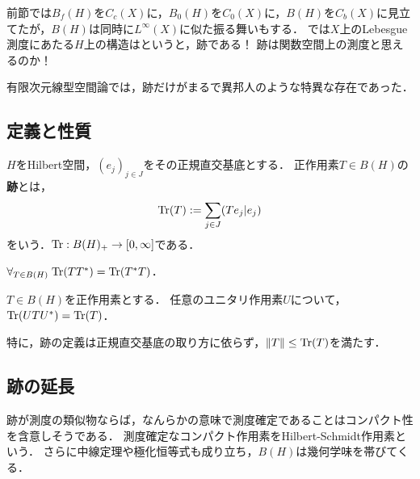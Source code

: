 \documentclass[uplatex,dvipdfmx]{jsreport}
\begin{document}
\begin{tcolorbox}[colframe=ForestGreen, colback=ForestGreen!10!white,breakable,colbacktitle=ForestGreen!40!white,coltitle=black,fonttitle=\bfseries\sffamily,
title=跡は関数空間上の測度とみなせる]
    前節では$B_f(H)$を$C_c(X)$に，$B_0(H)$を$C_0(X)$に，$B(H)$を$C_b(X)$に見立てたが，$B(H)$は同時に$L^\infty(X)$に似た振る舞いもする．
    では$X$上のLebesgue測度にあたる$H$上の構造はというと，跡である！
    跡は関数空間上の測度と思えるのか！

    有限次元線型空間論では，跡だけがまるで異邦人のような特異な存在であった．
\end{tcolorbox}

\subsection{定義と性質}

\begin{definition}[trace]
    $H$をHilbert空間，$(e_j)_{j\in J}$をその正規直交基底とする．
    正作用素$T\in B(H)$の\textbf{跡}とは，
    \[\mathrm{Tr}(T):=\sum_{j\in J}(Te_j|e_j)\]
    をいう．$\mathrm{Tr}:B(H)_+\to[0,\infty]$である．
\end{definition}

\begin{proposition}
    $\forall_{T\in B(H)}\;\mathrm{Tr}(TT^*)=\mathrm{Tr}(T^*T)$．
\end{proposition}

\begin{corollary}
    $T\in B(H)$を正作用素とする．
    任意のユニタリ作用素$U$について，$\mathrm{Tr}(UTU^*)=\mathrm{Tr}(T)$．
    
    特に，跡の定義は正規直交基底の取り方に依らず，$\|T\|\le\mathrm{Tr}(T)$を満たす．
\end{corollary}

\subsection{跡の延長}

\begin{tcolorbox}[colframe=ForestGreen, colback=ForestGreen!10!white,breakable,colbacktitle=ForestGreen!40!white,coltitle=black,fonttitle=\bfseries\sffamily,
title=]
    跡が測度の類似物ならば，なんらかの意味で測度確定であることはコンパクト性を含意しそうである．
    測度確定なコンパクト作用素をHilbert-Schmidt作用素という．
    さらに中線定理や極化恒等式も成り立ち，$B(H)$は幾何学味を帯びてくる．
\end{tcolorbox}
\end{document}
